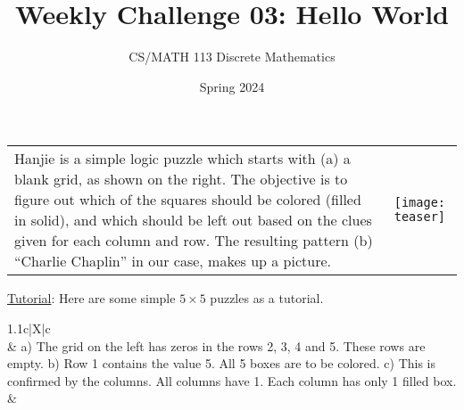 \documentclass[a4paper]{exam}
\title{Weekly Challenge 03: Hello World}
\author{CS/MATH 113 Discrete Mathematics}
\date{Spring 2024}
\begin{document}
\maketitle

\begin{questions}
  
  
  \begin{tabularx}{\linewidth}{Xc}
    Hanjie is a simple logic puzzle which starts with (a) a blank grid, as shown on the right. The objective is to figure out which of the squares should be colored (filled in solid), and which should be left out based on the clues given for each column and row. The resulting pattern (b) “Charlie Chaplin” in our case, makes up a picture.
    &
    \texttt{[image: teaser]}
  \end{tabularx}
  \smallskip

  \underline{Tutorial}: Here are some simple $5\times5$ puzzles as a tutorial.
  \smallskip

  \hspace{-15pt} \begin{tabularx}{1.1\linewidth}{c|X|c}
    \\
    &
    {\footnotesize
      a) The grid on the left has zeros in the rows 2, 3, 4 and 5. These rows are empty.\newline
      b) Row 1 contains the value 5. All 5 boxes are to be colored.\newline
      c) This is confirmed by the columns. All columns have 1. Each column has only 1 filled box.}
    &


\end{tabularx}
\end{questions}
\end{document}
